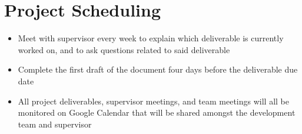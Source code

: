 \documentclass{article}
\begin{document}
\section{Project Scheduling}


    \begin{itemize}
        \item Meet with supervisor every week to explain which deliverable is currently worked on, and to ask questions related to said deliverable
        \item Complete the first draft of the document four days before the deliverable due date
        \item All project deliverables, supervisor meetings, and team meetings will all be monitored on Google Calendar that will be shared amongst the development team and supervisor
    \end{itemize}
\end{document}
